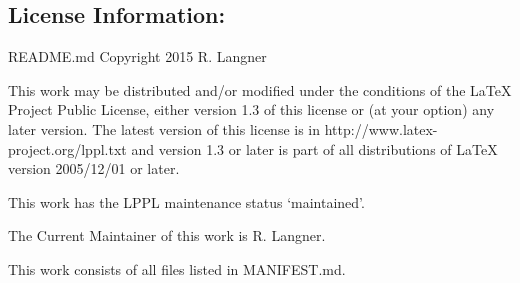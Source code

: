 \documentclass[]{article}
\begin{document}
\subsection{License Information:}\label{license-information}

README.md Copyright 2015 R. Langner

This work may be distributed and/or modified under the conditions of the
LaTeX Project Public License, either version 1.3 of this license or (at
your option) any later version. The latest version of this license is in
http://www.latex-project.org/lppl.txt and version 1.3 or later is part
of all distributions of LaTeX version 2005/12/01 or later.

This work has the LPPL maintenance status `maintained'.

The Current Maintainer of this work is R. Langner.

This work consists of all files listed in MANIFEST.md.
\end{document}
